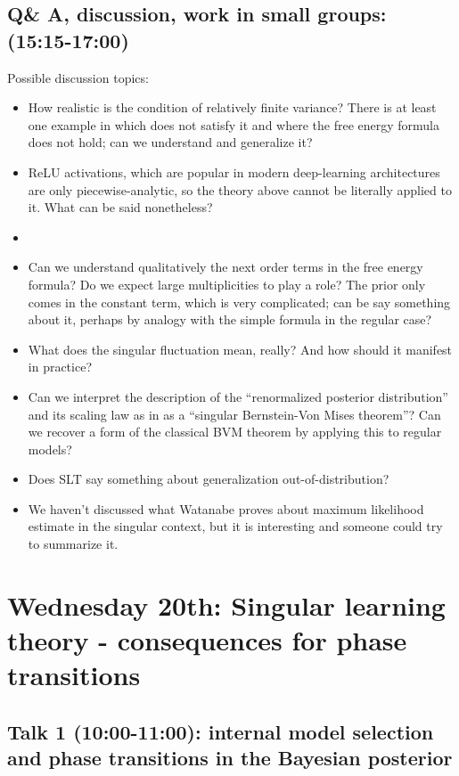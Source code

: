 \documentclass[a4paper,11pt]{amsart}
\begin{document}
\subsection*{Q\& A, discussion, work in small groups: (15:15-17:00)}
Possible discussion topics:
\begin{itemize}
\item How realistic is the condition of relatively finite variance? There is at least one example in \cite[\S 3.4 Example 19]{green-book} which does not satisfy it and where the free energy formula does not hold; can we understand and generalize it?
\item ReLU activations, which are popular in modern deep-learning architectures are only piecewise-analytic, so the theory above cannot be literally applied to it. What can be said nonetheless?
\item   
\item Can we understand qualitatively the next order terms in the free energy formula? Do we expect large multiplicities to play a role? The prior only comes in the constant term, which is very complicated; can be say something about it, perhaps by analogy with the simple formula in the regular case?
\item What does the singular fluctuation mean, really? And how should it manifest in practice?
\item Can we interpret the description of the ``renormalized posterior distribution'' and its scaling law as in \cite[\S 6.3]{grey-book} as a ``singular Bernstein-Von Mises theorem''? Can we recover a form of the classical BVM theorem by applying this to regular models?
\item Does SLT say something about generalization out-of-distribution?  
\item We haven't discussed what Watanabe proves about maximum likelihood estimate in the singular context, but it is interesting and someone could try to summarize it.
\end{itemize}

\section*{Wednesday 20th: Singular learning theory - consequences for phase transitions}

\subsection*{Talk 1 (10:00-11:00): internal model selection and phase transitions in the Bayesian posterior}
\end{document}

